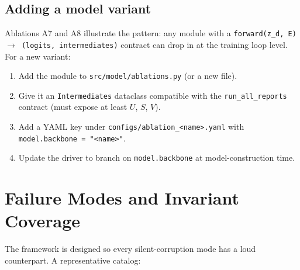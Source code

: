 \documentclass[11pt,a4paper]{article}
\begin{document}
\subsection{Adding a model variant}

Ablations A7 and A8 illustrate the pattern: any module with a
\texttt{forward(z\_d, E) $\to$ (logits, intermediates)} contract can
drop in at the training loop level. For a new variant:
\begin{enumerate}
\item Add the module to \texttt{src/model/ablations.py} (or a new file).
\item Give it an \texttt{Intermediates} dataclass compatible with
the \texttt{run\_all\_reports} contract (must expose at least
$U$, $S$, $V$).
\item Add a YAML key under \texttt{configs/ablation\_<name>.yaml}
with \texttt{model.backbone = "<name>"}.
\item Update the driver to branch on \texttt{model.backbone} at
model-construction time.
\end{enumerate}

\section{Failure Modes and Invariant Coverage}
\label{sec:failures}

The framework is designed so every silent-corruption mode has a loud
counterpart. A representative catalog:
\end{document}
